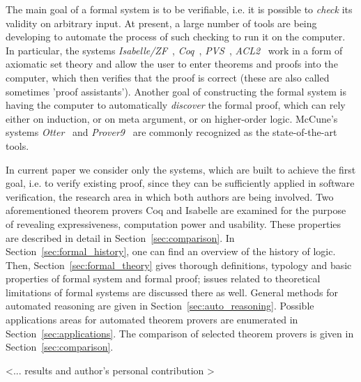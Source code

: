 \documentclass[article]{aaltoseries}
\begin{document}
The main goal of a formal system is to be verifiable, i.e. it is possible to \textit{check} its validity on arbitrary input. At present, a large number of tools are being developing to automate the process of such checking to run it on the computer. In particular, the systems \textit{Isabelle/ZF}~\cite{tool_Isabelle}, \textit{Coq}~\cite{tool_Coq}, \textit{PVS}~\cite{tool_Pvs}, \textit{ACL2}~\cite{tool_Acl} work in a form of axiomatic set theory and allow the user to enter theorems and proofs into the computer, which then verifies that the proof is correct (these are also called sometimes 'proof assistants').
Another goal of constructing the formal system is having the computer to automatically \textit{discover} the formal proof, which can rely either on induction, or on meta argument, or on higher-order logic. McCune’s systems \textit{Otter}~\cite{tool_Otter} and \textit{Prover9}~\cite{tool_Prover9} are commonly recognized as the state-of-the-art tools.

In current paper we consider only the systems, which are built to achieve the first goal, i.e. to verify existing proof, since they can be sufficiently applied in software verification, the research area in which both authors are being involved. Two aforementioned theorem provers Coq and Isabelle are examined for the purpose of revealing expressiveness, computation power and usability. These properties are described in detail in Section~\ref{sec:comparison}. 
In Section~\ref{sec:formal_history}, one can find an overview of the history of logic. Then, Section~\ref{sec:formal_theory} gives thorough definitions, typology and basic properties of formal system and formal proof; issues related to theoretical limitations of formal systems are discussed there as well. General methods for automated reasoning are given in Section~\ref{sec:auto_reasoning}. Possible applications areas for automated theorem provers are enumerated in Section~\ref{sec:applications}. The comparison of selected theorem provers is given in Section~\ref{sec:comparison}.

<... results and author's personal contribution >


\end{document}
